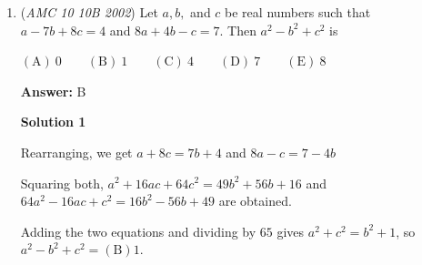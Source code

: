 \begin{enumerate}
\textbf{Solution 3}

Subtracting the 2 given equations yields

 
$(a_{101}-a_1)+(a_{102}-a_2)+(a_{103}-a_3)+...+(a_{200}-a_{100})=100$

 
Now express each $a_n$ in terms of first term $a_1$ and common difference $x$ between consecutive terms

 
$((a_1+100x)-(a_1))+((a_1+101x)-(a_1+x))+((a_1+102x)-(a_1+2x))+...+((a_1+199x)-(a_1+99x))=100$

 
Simplifying and canceling $a_1$ and $x$ terms gives

 
$100x+100x+100x+...+100x=100$
$100x\times100=100$
$100x=1$
$x=0.01=\boxed{(\textbf{C})\ 0.01}$




\textbf{Solution 4}

Use the Summation Formula, $S = \frac{n}{2}(2a+(n-1)d)$. For the first equation given, you can plug in values as such: 
 \[100 = \frac{100}{2}(2a+99d).\] Solving this gets $2a+99d = 2$. Doing the same for the second equation given, you get 
 \[200 = \frac{100}{2}(2a+99d).\] or $2a+99d=4$. Well, notice that you started summing from $a_{101}$ rather than $a_1$. So, use the explicit formula to get $a_{101} = a_1 + (101-1)d$, or $a_{101} = a + 100d$. Substitution gets $2a + 299d = 4$. Now, we need the value of $d$, as $a_2 - a_1 = d$. Use elimination on the two equations found to get $200d = 2$. Therefore, $d = \frac{1}{100}$, or $\boxed{(\textbf{C})\ 0.01}$.

 -N.

 


	\item (\textit{AMC 10 10B 2002}) Let $a, b,$ and $c$ be real numbers such that $a-7b+8c=4$ and $8a+4b-c=7.$ Then $a^2-b^2+c^2$ is


 $\mathrm{(A) \ } 0\qquad \mathrm{(B) \ } 1\qquad \mathrm{(C) \ } 4\qquad \mathrm{(D) \ } 7\qquad \mathrm{(E) \ } 8$

 \textbf{Answer: }B



\textbf{Solution 1}

Rearranging, we get $a+8c=7b+4$ and $8a-c=7-4b$

 Squaring both, $a^2+16ac+64c^2=49b^2+56b+16$ and $64a^2-16ac+c^2=16b^2-56b+49$ are obtained.

 Adding the two equations and dividing by $65$ gives $a^2+c^2=b^2+1$, so $a^2-b^2+c^2=\boxed{(\text{B})1}$.

 




\end{enumerate}
